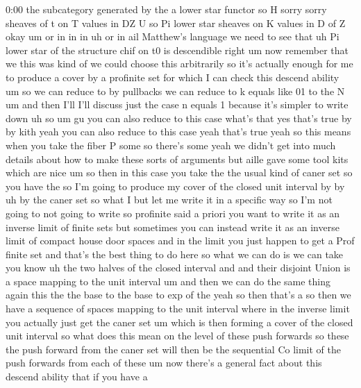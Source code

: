 \begin{unfinished}{0:00}
the  subcategory  generated  by  the  a  lower
star  functor  so  H
sorry  sorry  sheaves  of  t  on  T  values  in
DZ  U  so  Pi  lower  star  sheaves  on  K
values  in  D  of
Z
okay  um  or  in  in  in  uh  or  in  ail
Matthew's  language  we  need  to  see  that
uh  Pi  lower  star  of  the  structure  chif
on  t0  is
descendible
right  um  now  remember  that  we  this  was
kind  of  we  could  choose  this  arbitrarily
so  it's  actually  enough  for  me  to
produce  a  cover  by  a  profinite  set  for
which  I  can  check  this  descend  ability
um  so  we  can  reduce  to  by  pullbacks  we
can  reduce  to  k  equals  like  01  to  the
N  um  and  then  I'll  I'll
discuss  just  the  case  n  equals  1  because
it's  simpler  to  write
down
uh
so
um  gu  you  can  also  reduce  to  this  case
what's  that  yes  that's  true  by  by  kith
yeah  you  can  also  reduce  to  this  case
yeah  that's  true
yeah  so  this  means  when  you  take  the
fiber  P
some  so  there's  some  yeah  we  didn't  get
into  much  details  about  how  to  make
these  sorts  of  arguments  but  aille  gave
some  tool  kits  which  are  nice  um  so  then
in  this  case  you  take  the  the  usual  kind
of  caner  set  so  you  have  the  so  I'm
going  to  produce  my  cover  of  the  closed
unit  interval  by  by  uh  by  the  caner  set
so  what  I  but  let  me  write  it  in  a
specific  way  so  I'm  not  going  to  not
going  to  write  so  profinite  said  a
priori  you  want  to  write  it  as  an
inverse  limit  of  finite  sets  but
sometimes  you  can  instead  write  it  as  an
inverse  limit  of  compact  house  door
spaces  and  in  the  limit  you  just  happen
to  get  a  Prof  finite  set  and  that's  the
best  thing  to  do  here  so  what  we  can  do
is  we  can  take  you  know
uh  the  two  halves  of  the  closed  interval
and  and  their  disjoint  Union  is  a  space
mapping  to  the  unit  interval  um  and  then
we  can  do  the  same  thing  again  this  the
the  base  to  the  base  to  exp  of  the  yeah
so  then  that's  a  so  then  we  have  a
sequence  of  spaces  mapping  to  the  unit
interval  where  in  the  inverse  limit  you
actually  just  get  the  caner  set  um  which
is  then  forming  a  cover  of  the  closed
unit  interval  so  what  does  this  mean  on
the  level  of  these  push  forwards  so
these  the  push  forward  from  the  caner
set  will  then  be  the  sequential  Co  limit
of  the  push  forwards  from  each  of
these
um  now  there's  a  general  fact  about  this
descend  ability  that  if  you  have  a

\end{unfinished}
